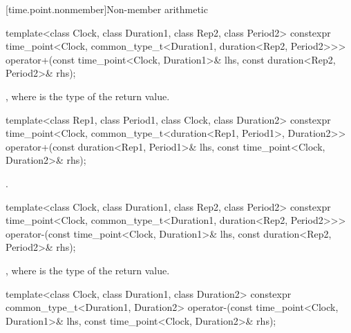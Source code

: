 [time.point.nonmember]{Non-member arithmetic}

%
%
\begin{itemdecl}
template<class Clock, class Duration1, class Rep2, class Period2>
  constexpr time_point<Clock, common_type_t<Duration1, duration<Rep2, Period2>>>
    operator+(const time_point<Clock, Duration1>& lhs, const duration<Rep2, Period2>& rhs);
\end{itemdecl}

\begin{itemdescr}
\pnum
\returns
{}, where  is the type of the return value.
\end{itemdescr}

%
%
\begin{itemdecl}
template<class Rep1, class Period1, class Clock, class Duration2>
  constexpr time_point<Clock, common_type_t<duration<Rep1, Period1>, Duration2>>
    operator+(const duration<Rep1, Period1>& lhs, const time_point<Clock, Duration2>& rhs);
\end{itemdecl}

\begin{itemdescr}
\pnum
\returns
{}.
\end{itemdescr}

%
%
\begin{itemdecl}
template<class Clock, class Duration1, class Rep2, class Period2>
  constexpr time_point<Clock, common_type_t<Duration1, duration<Rep2, Period2>>>
    operator-(const time_point<Clock, Duration1>& lhs, const duration<Rep2, Period2>& rhs);
\end{itemdecl}

\begin{itemdescr}
\pnum
\returns
{},
where  is the type of the return value.
\end{itemdescr}

%
\begin{itemdecl}
template<class Clock, class Duration1, class Duration2>
  constexpr common_type_t<Duration1, Duration2>
    operator-(const time_point<Clock, Duration1>& lhs, const time_point<Clock, Duration2>& rhs);
\end{itemdecl}

